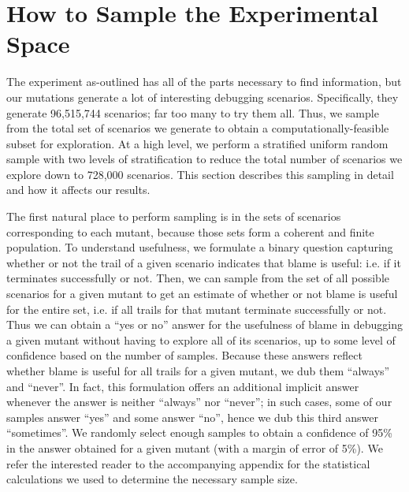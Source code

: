 \section{How to Sample the Experimental Space} 

The experiment as-outlined has all of the parts necessary to find information, but our mutations generate a lot of interesting debugging scenarios.
Specifically, they generate 96,515,744 scenarios; far too many to try them all.
Thus, we sample from the total set of scenarios we generate to obtain a computationally-feasible subset for exploration.
At a high level, we perform a stratified uniform random sample with two levels of stratification to reduce the total number of scenarios we explore down to 728,000 scenarios.
This section describes this sampling in detail and how it affects our results.

The first natural place to perform sampling is in the sets of scenarios corresponding to each mutant, because those sets form a coherent and finite population.
To understand usefulness, we formulate a binary question capturing whether or not the trail of a given scenario indicates that blame is useful: i.e. if it terminates successfully or not.
Then, we can sample from the set of all possible scenarios for a given mutant to get an estimate of whether or not blame is useful for the entire set, i.e. if all trails for that mutant terminate successfully or not.
Thus we can obtain a ``yes or no'' answer for the usefulness of blame in debugging a given mutant without having to explore all of its scenarios, up to some level of confidence based on the number of samples.
Because these answers reflect whether blame is useful for all trails for a given mutant, we dub them ``always'' and ``never''.
In fact, this formulation offers an additional implicit answer whenever the answer is neither ``always'' nor ``never'';
in such cases, some of our samples answer ``yes'' and some answer ``no'', hence we dub this third answer ``sometimes''.
We randomly select enough samples to obtain a confidence of 95\% in the answer obtained for a given mutant (with a margin of error of 5\%).
We refer the interested reader to the accompanying appendix for the statistical calculations we used to determine the necessary sample size.

